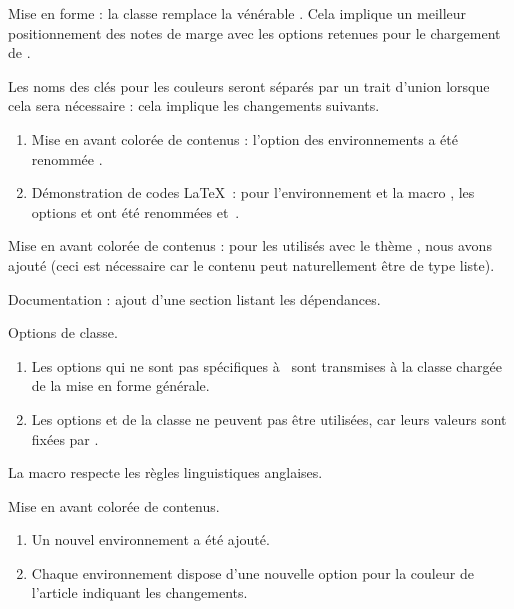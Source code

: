 \documentclass{tutodoc}
\begin{document}
\begin{tdocbreak}
	\item Mise en forme : la classe  remplace la vénérable . Cela implique un meilleur positionnement des notes de marge avec les options retenues pour le chargement de .


	\item Les noms des clés pour les couleurs seront séparés par un trait d'union lorsque cela sera nécessaire : cela implique les changements suivants.
	\begin{enumerate}
		\item Mise en avant colorée de contenus : l'option  des environnements a été renommée .

		\item Démonstration de codes \LaTeX\ : pour l'environnement  et la macro , les options  et  ont été renommées  et \,.
	\end{enumerate}
\end{tdocbreak}


\begin{tdocfix}
	\item Mise en avant colorée de contenus : pour les  utilisés avec le thème , nous avons ajouté  (ceci est nécessaire car le contenu peut naturellement être de type liste).
\end{tdocfix}


\begin{tdocnew}
	\item Documentation : ajout d'une section listant les dépendances.

	\item Options de classe.
	\begin{enumerate}
		\item Les options qui ne sont pas spécifiques à \thisproj\ sont transmises à la classe chargée de la mise en forme générale.

		\item Les options  et  de la classe  ne peuvent pas être utilisées, car leurs valeurs sont fixées par \thisproj.
	\end{enumerate}

	\item La macro  respecte les règles linguistiques anglaises.

	\item Mise en avant colorée de contenus.
	\begin{enumerate}
		\item Un nouvel environnement  a été ajouté.

		\item Chaque environnement dispose d'une nouvelle option  pour la couleur de l'article indiquant les changements.
	\end{enumerate}
\end{tdocnew}
\end{document}
